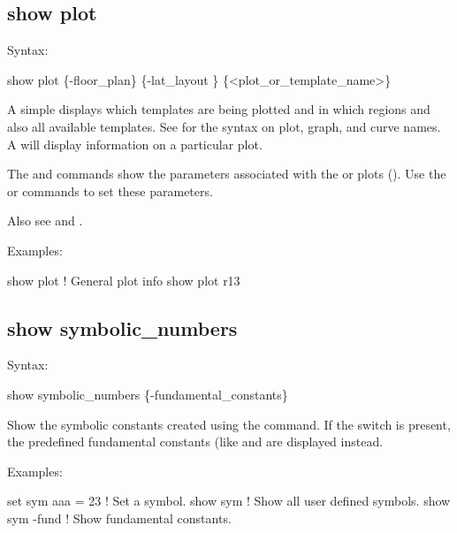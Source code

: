 {{{{{{%

\subsection{show plot}
\label{s:show.plot}

Syntax:
\begin{example}
  show plot \{-floor_plan\} \{-lat_layout \} \{<plot_or_template_name>\}
\end{example}

A simple  displays which templates are being plotted and in which regions
and also all available templates. See  for the syntax on plot, graph, and
curve names. A  will display information on a
particular plot.

The  and  commands show the parameters
associated with the  or  plots ().
Use the  or  commands to set these parameters.

Also see  and .

Examples:
\begin{example}
  show plot      ! General plot info
  show plot r13
\end{example}


\subsection{show symbolic_numbers}
\label{s:show.symbolic}

Syntax:
\begin{example}
  show symbolic_numbers \{-fundamental_constants\}
\end{example}

Show the symbolic constants created using the  command. If the
 switch is present, the predefined fundamental constants (like 
and  are displayed instead.

Examples:
\begin{example}
  set sym aaa = 23  ! Set a symbol.
  show sym          ! Show all user defined symbols.
  show sym -fund    ! Show fundamental constants.
\end{example}

}}}}}}
